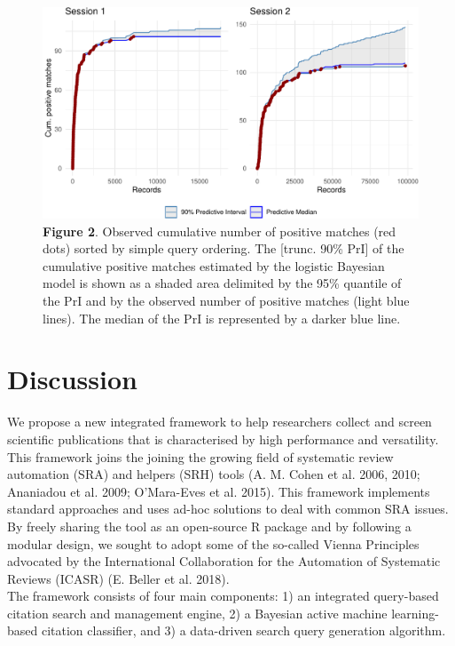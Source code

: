\documentclass{article}
\begin{document}
\begin{figure}
\centering
\includegraphics{Manuscript_files/figure-latex/performance plot-1.pdf}
\caption{\textbf{Figure 2}. Observed cumulative number of positive
matches (red dots) sorted by simple query ordering. The {[}trunc. 90\%
PrI{]} of the cumulative positive matches estimated by the logistic
Bayesian model is shown as a shaded area delimited by the 95\% quantile
of the PrI and by the observed number of positive matches (light blue
lines). The median of the PrI is represented by a darker blue line.}
\end{figure}

\hypertarget{discussion}{%
\section{Discussion}\label{discussion}}

We propose a new integrated framework to help researchers collect and
screen scientific publications that is characterised by high performance
and versatility. This framework joins the joining the growing field of
systematic review automation (SRA) and helpers (SRH) tools (A. M. Cohen
et al. 2006, 2010; Ananiadou et al. 2009; O'Mara-Eves et al. 2015). This
framework implements standard approaches and uses ad-hoc solutions to
deal with common SRA issues. By freely sharing the tool as an
open-source R package and by following a modular design, we sought to
adopt some of the so-called Vienna Principles advocated by the
International Collaboration for the Automation of Systematic Reviews
(ICASR) (E. Beller et al. 2018).\\
The framework consists of four main components: 1) an integrated
query-based citation search and management engine, 2) a Bayesian active
machine learning-based citation classifier, and 3) a data-driven search
query generation algorithm.\\
\end{document}

